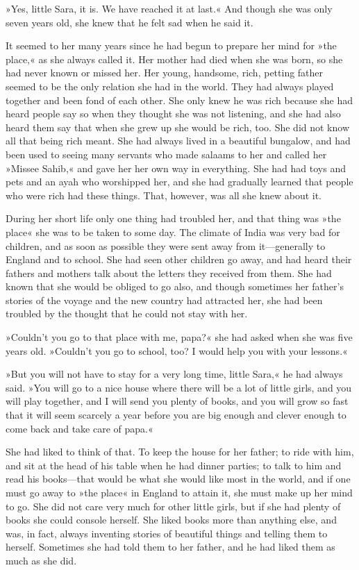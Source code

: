 »Yes, little Sara, it is. We have reached it at last.« And though she was only seven years old, she knew that he felt sad when he said it.

It seemed to her many years since he had begun to prepare her mind for »the place,« as she always called it. Her mother had died when she was born, so she had never known or missed her. Her young, handsome, rich, petting father seemed to be the only relation she had in the world. They had always played together and been fond of each other. She only knew he was rich because she had heard people say so when they thought she was not listening, and she had also heard them say that when she grew up she would be rich, too. She did not know all that being rich meant. She had always lived in a beautiful bungalow, and had been used to seeing many servants who made salaams to her and called her »Missee Sahib,« and gave her her own way in everything. She had had toys and pets and an ayah who worshipped her, and she had gradually learned that people who were rich had these things. That, however, was all she knew about it.

During her short life only one thing had troubled her, and that thing was »the place« she was to be taken to some day. The climate of India was very bad for children, and as soon as possible they were sent away from it—generally to England and to school. She had seen other children go away, and had heard their fathers and mothers talk about the letters they received from them. She had known that she would be obliged to go also, and though sometimes her father's stories of the voyage and the new country had attracted her, she had been troubled by the thought that he could not stay with her.

»Couldn't you go to that place with me, papa?« she had asked when she was five years old. »Couldn't you go to school, too? I would help you with your lessons.«

»But you will not have to stay for a very long time, little Sara,« he had always said. »You will go to a nice house where there will be a lot of little girls, and you will play together, and I will send you plenty of books, and you will grow so fast that it will seem scarcely a year before you are big enough and clever enough to come back and take care of papa.«

She had liked to think of that. To keep the house for her father; to ride with him, and sit at the head of his table when he had dinner parties; to talk to him and read his books—that would be what she would like most in the world, and if one must go away to »the place« in England to attain it, she must make up her mind to go. She did not care very much for other little girls, but if she had plenty of books she could console herself. She liked books more than anything else, and was, in fact, always inventing stories of beautiful things and telling them to herself. Sometimes she had told them to her father, and he had liked them as much as she did.

